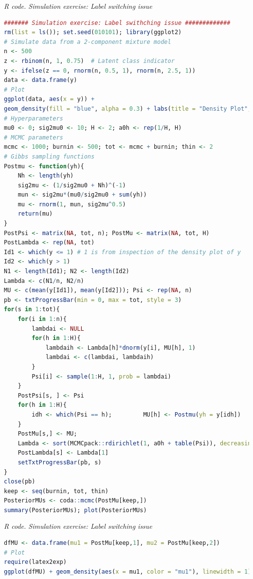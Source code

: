 \begin{tcolorbox}[enhanced,width=4.67in,center upper,
	fontupper=\large\bfseries,drop shadow southwest,sharp corners]
	\textit{R code. Simulation exercise: Label switching issue}
	\begin{VF}
		\begin{lstlisting}[language=R]
			####### Simulation exercise: Label swithching issue #############
rm(list = ls()); set.seed(010101); library(ggplot2)
# Simulate data from a 2-component mixture model
n <- 500
z <- rbinom(n, 1, 0.75)  # Latent class indicator
y <- ifelse(z == 0, rnorm(n, 0.5, 1), rnorm(n, 2.5, 1))
data <- data.frame(y)
# Plot
ggplot(data, aes(x = y)) +
geom_density(fill = "blue", alpha = 0.3) + labs(title = "Density Plot", x = "y", y = "Density") + theme_minimal()
# Hyperparameters
mu0 <- 0; sig2mu0 <- 10; H <- 2; a0h <- rep(1/H, H)
# MCMC parameters
mcmc <- 1000; burnin <- 500; tot <- mcmc + burnin; thin <- 2
# Gibbs sampling functions
Postmu <- function(yh){
	Nh <- length(yh)
	sig2mu <- (1/sig2mu0 + Nh)^(-1)
	mun <- sig2mu*(mu0/sig2mu0 + sum(yh))
	mu <- rnorm(1, mun, sig2mu^0.5)
	return(mu)
}
PostPsi <- matrix(NA, tot, n); PostMu <- matrix(NA, tot, H)
PostLambda <- rep(NA, tot)
Id1 <- which(y <= 1) # 1 is from inspection of the density plot of y 
Id2 <- which(y > 1)
N1 <- length(Id1); N2 <- length(Id2)
Lambda <- c(N1/n, N2/n)
MU <- c(mean(y[Id1]), mean(y[Id2])); Psi <- rep(NA, n)
pb <- txtProgressBar(min = 0, max = tot, style = 3)
for(s in 1:tot){
	for(i in 1:n){
		lambdai <- NULL
		for(h in 1:H){
			lambdaih <- Lambda[h]*dnorm(y[i], MU[h], 1)
			lambdai <- c(lambdai, lambdaih)
		}
		Psi[i] <- sample(1:H, 1, prob = lambdai)
	}
	PostPsi[s, ] <- Psi
	for(h in 1:H){
		idh <- which(Psi == h); 		MU[h] <- Postmu(yh = y[idh])
	}
	PostMu[s,] <- MU; 
	Lambda <- sort(MCMCpack::rdirichlet(1, a0h + table(Psi)), decreasing = TRUE)
	PostLambda[s] <- Lambda[1]
	setTxtProgressBar(pb, s)
}
close(pb)
keep <- seq(burnin, tot, thin)
PosteriorMUs <- coda::mcmc(PostMu[keep,])
summary(PosteriorMUs); plot(PosteriorMUs)
\end{lstlisting}
	\end{VF}
\end{tcolorbox}
 
\begin{tcolorbox}[enhanced,width=4.67in,center upper,
	fontupper=\large\bfseries,drop shadow southwest,sharp corners]
	\textit{R code. Simulation exercise: Label switching issue}
	\begin{VF}
		\begin{lstlisting}[language=R]
dfMU <- data.frame(mu1 = PostMu[keep,1], mu2 = PostMu[keep,2])
# Plot
require(latex2exp)
ggplot(dfMU) + geom_density(aes(x = mu1, color = "mu1"), linewidth = 1) + geom_density(aes(x = mu2, color = "mu2"), linewidth = 1) + labs(title = "Density Plot", x = TeX("$\\mu$"), y = "Density", color = "Variable") + theme_minimal() + scale_color_manual(values = c("mu1" = "blue", "mu2" = "red"))
\end{lstlisting}
	\end{VF}
\end{tcolorbox}

